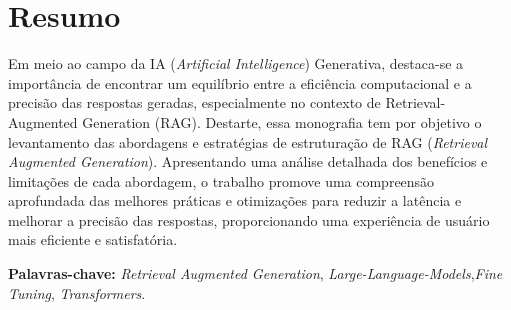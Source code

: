 \section*{Resumo}

Em meio ao campo da IA (\textit{Artificial Intelligence}) Generativa, destaca-se a importância de encontrar um equilíbrio entre a eficiência computacional e a precisão das respostas geradas, especialmente no contexto de Retrieval-Augmented Generation (RAG). Destarte, essa monografia tem por objetivo o levantamento das abordagens e estratégias de estruturação de RAG (\textit{Retrieval Augmented Generation}). Apresentando uma análise detalhada dos benefícios e limitações de cada abordagem, o trabalho promove uma compreensão aprofundada das melhores práticas e otimizações para reduzir a latência e melhorar a precisão das respostas, proporcionando uma experiência de usuário mais eficiente e satisfatória.


\textbf{Palavras-chave:} \textit{Retrieval Augmented Generation}, \textit{Large-Language-Models},\textit{Fine Tuning}, \textit{Transformers}.